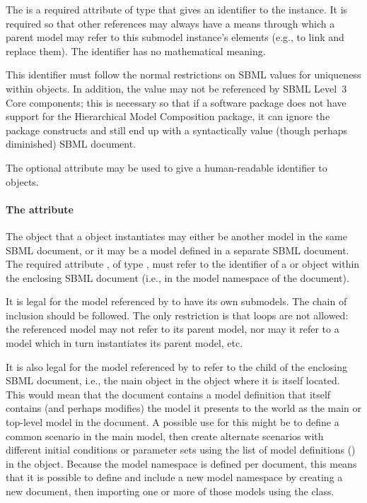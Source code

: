 The  is a required attribute of type  that gives
an identifier to the \Submodel instance.  It is required so that other
references may always have a means through which a parent model may
refer to this submodel instance's elements (e.g., to link and replace
them).  The identifier has no mathematical meaning.

This identifier must follow the normal restrictions on SBML
 values for uniqueness within \Model objects.  In
addition, the  value may not be referenced by SBML Level~3
Core components; this is necessary so that if a software package does
not have support for the Hierarchical Model Composition package, it can
ignore the package constructs and still end up with a syntactically
value (though perhaps diminished) SBML document.  

The optional attribute  may be used to give a human-readable identifier to \Submodel objects.  

\paragraph{The \hspace*{1pt} attribute}
\label{submodel-modelref}
  
The \Model object that a \Submodel object instantiates may either be
another model in the same SBML document, or it may be a model defined in
a separate SBML document.  The required attribute , of
type , must refer to the identifier of a \Model or
\ExternalModelDefinition object within the enclosing SBML document
(i.e., in the model namespace of the document).  

It is legal for the model referenced by  to have its own submodels.
The chain of inclusion should be followed.  The only restriction is that
loops are not allowed: the referenced model may not refer to its parent
model, nor may it refer to a model which in turn instantiates its parent
model, etc.

It is also legal for the model referenced by  to refer
to the  child of the enclosing SBML document, i.e., the
main \Model object in the \SBML object where it is itself located.  This
would mean that the document contains a model definition that itself
contains (and perhaps modifies) the model it presents to the world as
the main or top-level model in the document.  A possible use for this
might be to define a common scenario in the main model, then create
alternate scenarios with different initial conditions or parameter sets using the list of
model definitions () in the \SBML object.
Because the model namespace is defined per document, this means that it
is possible to define and include a new model namespace by creating a
new document, then importing one or more of those models using the
\ExternalModelDefinition class.


